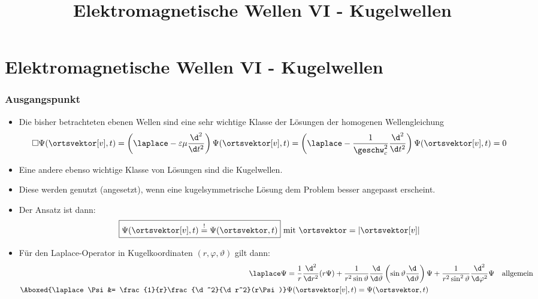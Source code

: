 
  
\title[TET: Elektromagnetische Wellen VI - Kugelwellen]{Elektromagnetische Wellen VI - Kugelwellen}


% 
% 

\maketitle

% 
% 
\section{Elektromagnetische Wellen VI - Kugelwellen}

\begin{frame}
  \frametitle{Ausgangspunkt}
  \begin{itemize}[<+->]
  \item Die bisher betrachteten \alert{ebenen Wellen} sind eine sehr wichtige Klasse der Lösungen der \alert{homogenen Wellengleichung}
    \begin{equation*}
      \square\Psi(\ortsvektor[v],t) = \left(\laplace - \varepsilon\mu\frac{\d^2}{\d t^2}\right)\Psi(\ortsvektor[v],t) = \left(\laplace - \frac{1}{\geschw_c^2}\frac{\d^2}{\d t^2}\right)\Psi(\ortsvektor[v],t) = 0
    \end{equation*}
  \item Eine andere ebenso wichtige Klasse von Lösungen sind die \alert{Kugelwellen}.
  \item Diese werden genutzt (angesetzt), wenn eine \alert{kugelsymmetrische Lösung} dem Problem besser angepasst erscheint.
  \item Der \alert{Ansatz} ist dann:
    \begin{equation*}
      \boxed{\Psi(\ortsvektor[v],t) \stackrel{!}{=} \Psi(\ortsvektor,t)} \text{ mit } \ortsvektor = |\ortsvektor[v]|
    \end{equation*}
  \item Für den \alert{Laplace-Operator} in \alert{Kugelkoordinaten} \((r,\varphi,\vartheta)\) gilt dann:
    \begin{align*}
      \laplace \Psi &= \frac{1}{r} \frac{\d^2}{\d r^2}(r\Psi) + \frac{1}{r^2\sin\vartheta} \frac{\d}{\d\vartheta} \left(\sin\vartheta\frac{\d}{\d \vartheta}\right)\Psi + \frac{1}{r^2\sin^2\vartheta}\frac{\d^2}{\d \varphi^2}\Psi &\text{allgemein}\\
      \Aboxed{\laplace \Psi&= \frac{1}{r}\frac{\d^2}{\d r^2}(r\Psi)} & \Psi(\ortsvektor[v],t) = \Psi(\ortsvektor,t)
      \end{align*}
  \end{itemize}
  \end{frame}

